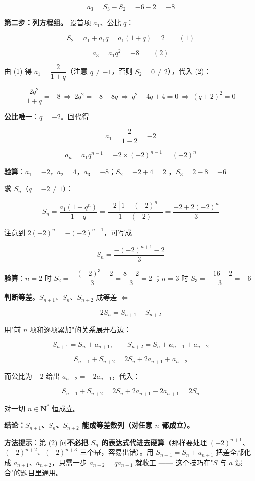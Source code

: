 \[a_3=S_3-S_2=-6-2=-8\]

\textbf{第二步：列方程组。} 设首项 $a_1$、公比 $q$：

\[S_2=a_1+a_1q=a_1(1+q)=2\qquad(1)\]

\[a_3=a_1q^{2}=-8\qquad(2)\]

由 (1) 得 $a_1=\dfrac2{1+q}$（注意 $q\ne-1$，否则 $S_2=0\ne2$），代入 (2)：

\[\frac{2q^{2}}{1+q}=-8\ \Longrightarrow\ 2q^{2}=-8-8q\ \Longrightarrow\ q^{2}+4q+4=0\ \Longrightarrow\ (q+2)^{2}=0\]

\textbf{公比唯一}：$q=-2$。回代得

\[a_1=\frac2{1-2}=-2\]

\[a_n=a_1q^{n-1}=-2\times(-2)^{n-1}=(-2)^{n}\]


\textbf{验算}：$a_1=-2$，$a_2=4$，$a_3=-8$；$S_2=-2+4=2$ ，$S_3=2-8=-6$ 


\textbf{求 $S_n$}（$q=-2\ne1$）：

\[S_n=\frac{a_1\left(1-q^{n}\right)}{1-q}=\frac{-2\left[1-(-2)^{n}\right]}{1-(-2)}=\frac{-2+2(-2)^{n}}3\]

注意到 $2(-2)^{n}=-(-2)^{n+1}$，可写成

\[S_n=\frac{-(-2)^{n+1}-2}3\]

\textbf{验算}：$n=2$ 时 $S_2=\dfrac{-(-2)^{3}-2}3=\dfrac{8-2}3=2$ ；$n=3$ 时 $S_3=\dfrac{-16-2}3=-6$ 

\textbf{判断等差}。$S_{n+1}$、$S_n$、$S_{n+2}$ 成等差 $\iff$

\[2S_n=S_{n+1}+S_{n+2}\]

用"前 $n$ 项和逐项累加"的关系展开右边：

\[S_{n+1}=S_n+a_{n+1},\qquad S_{n+2}=S_n+a_{n+1}+a_{n+2}\]

\[S_{n+1}+S_{n+2}=2S_n+2a_{n+1}+a_{n+2}\]

而公比为 $-2$ 给出 $a_{n+2}=-2a_{n+1}$，代入：

\[S_{n+1}+S_{n+2}=2S_n+2a_{n+1}-2a_{n+1}=2S_n\]

对一切 $n\in\mathbf N^{*}$ 恒成立。

\textbf{结论：$S_{n+1}$、$S_n$、$S_{n+2}$ 能成等差数列（对任意 $n$ 都成立）。}

\begin{gktip}
\textbf{方法提示}：第 (2) 问\textbf{不必把 $S_n$ 的表达式代进去硬算}（那样要处理 $(-2)^{n+1}$、$(-2)^{n+2}$、$(-2)^{n+3}$ 三个幂，容易出错）。用 $S_{n+1}=S_n+a_{n+1}$ 把差全部化成 $a_{n+1}$、$a_{n+2}$，只需一步 $a_{n+2}=qa_{n+1}$ 就收工 —— 这个技巧在"$S$ 与 $a$ 混合"的题目里通用。
\end{gktip}

